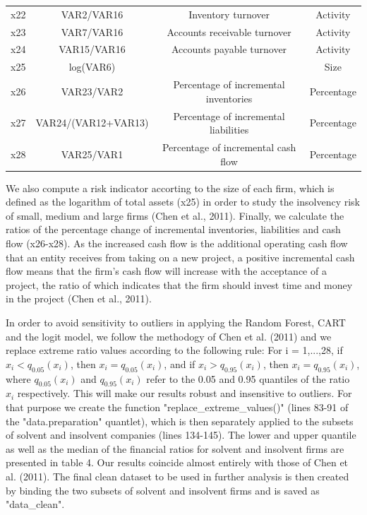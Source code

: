 \documentclass{article}
\begin{document}
\begin{table}[t]
\begin{center}
\begin{tabular}{cccc}
x22 & VAR2/VAR16 & Inventory turnover & Activity\\
x23 & VAR7/VAR16 & Accounts receivable turnover & Activity\\
x24 & VAR15/VAR16 & Accounts payable turnover & Activity\\
x25 & log(VAR6) & & Size\\
x26 & VAR23/VAR2 & Percentage of incremental inventories & Percentage\\
x27 & VAR24/(VAR12+VAR13) & Percentage of incremental liabilities & Percentage\\
x28 & VAR25/VAR1 & Percentage of incremental cash flow & Percentage\\ 
\hline\hline
\end{tabular}
\end{center}
\end{table}

 We also compute a risk indicator accorting to the size of each firm, which is defined as the logarithm of total assets (x25) in order to study the insolvency risk of small, medium and large firms (Chen et al., 2011). Finally, we calculate the ratios of the percentage change of incremental inventories, liabilities and cash flow (x26-x28). As the increased cash flow is the additional operating cash flow that an entity receives from taking on a new project, a positive incremental cash flow means that the firm's cash flow will increase with the acceptance of a project, the ratio of which indicates that the firm should invest time and money in the project (Chen et al., 2011). 
 
 In order to avoid sensitivity to outliers in applying the Random Forest, CART and the logit model, we follow the methodogy of Chen et al. (2011) and we replace extreme ratio values according to the following rule: For i = 1,...,28, if $x_i<q_{0.05}(x_i)$, then $x_i=q_{0.05}(x_i)$, and if $x_i>q_{0.95}(x_i)$, then $x_i=q_{0.95}(x_i)$, where $q_{0.05}(x_i)$ and $q_{0.95}(x_i)$ refer to the 0.05 and 0.95 quantiles of the ratio $x_i$ respectively. This will make our results robust and insensitive to outliers. For that purpose we create the function "replace\_extreme\_values()" (lines 83-91 of the "data.preparation" quantlet), which is then separately applied to the subsets of solvent and insolvent companies (lines 134-145). The lower and upper quantile as well as the median of the financial ratios for solvent and insolvent firms are presented in table 4. Our results coincide almost entirely with those of Chen et al. (2011).  The final clean dataset to be used in further analysis is then created by binding the two subsets of solvent and insolvent firms and is saved as "data\_clean".
\end{document}
